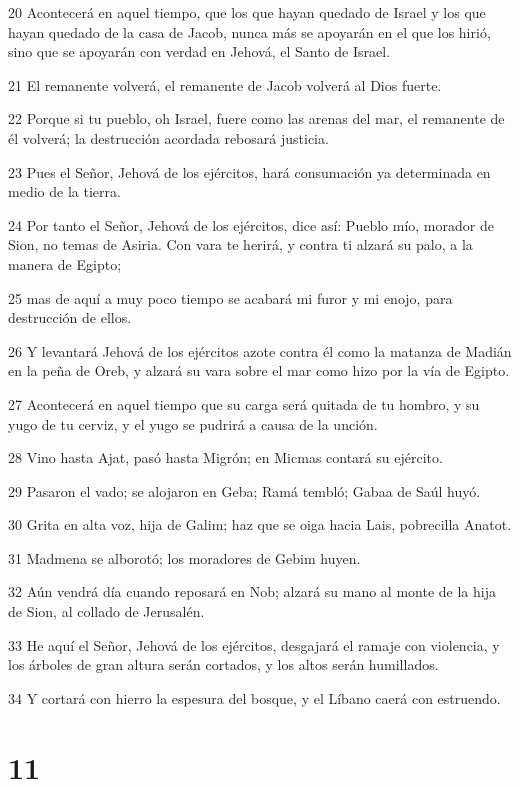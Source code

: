 \par 20 Acontecerá en aquel tiempo, que los que hayan quedado de Israel y los que hayan quedado de la casa de Jacob, nunca más se apoyarán en el que los hirió, sino que se apoyarán con verdad en Jehová, el Santo de Israel.
\par 21 El remanente volverá, el remanente de Jacob volverá al Dios fuerte.
\par 22 Porque si tu pueblo, oh Israel, fuere como las arenas del mar, el remanente de él volverá; la destrucción acordada rebosará justicia.
\par 23 Pues el Señor, Jehová de los ejércitos, hará consumación ya determinada en medio de la tierra. 
\par 24 Por tanto el Señor, Jehová de los ejércitos, dice así: Pueblo mío, morador de Sion, no temas de Asiria. Con vara te herirá, y contra ti alzará su palo, a la manera de Egipto;
\par 25 mas de aquí a muy poco tiempo se acabará mi furor y mi enojo, para destrucción de ellos.
\par 26 Y levantará Jehová de los ejércitos azote contra él como la matanza de Madián en la peña de Oreb, y alzará su vara sobre el mar como hizo por la vía de Egipto.
\par 27 Acontecerá en aquel tiempo que su carga será quitada de tu hombro, y su yugo de tu cerviz, y el yugo se pudrirá a causa de la unción.
\par 28 Vino hasta Ajat, pasó hasta Migrón; en Micmas contará su ejército.
\par 29 Pasaron el vado; se alojaron en Geba; Ramá tembló; Gabaa de Saúl huyó.
\par 30 Grita en alta voz, hija de Galim; haz que se oiga hacia Lais, pobrecilla Anatot.
\par 31 Madmena se alborotó; los moradores de Gebim huyen.
\par 32 Aún vendrá día cuando reposará en Nob; alzará su mano al monte de la hija de Sion, al collado de Jerusalén.
\par 33 He aquí el Señor, Jehová de los ejércitos, desgajará el ramaje con violencia, y los árboles de gran altura serán cortados, y los altos serán humillados.
\par 34 Y cortará con hierro la espesura del bosque, y el Líbano caerá con estruendo.

\chapter{11}

